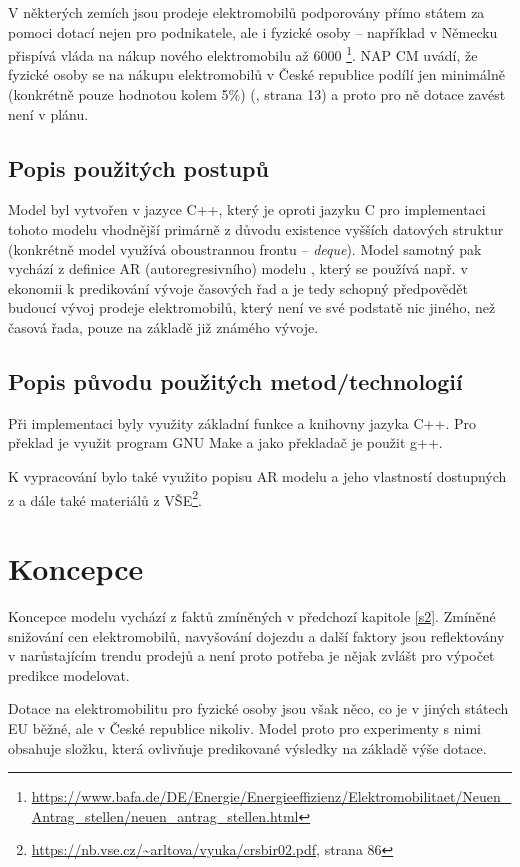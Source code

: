 \documentclass[14pt]{extarticle}
\begin{document}
	V některých zemích jsou prodeje elektromobilů podporovány přímo státem za pomoci dotací nejen pro podnikatele, ale i fyzické osoby -- například v Německu přispívá vláda na nákup nového elektromobilu až 6000	\texteuro\footnote{\url{https://www.bafa.de/DE/Energie/Energieeffizienz/Elektromobilitaet/Neuen_Antrag_stellen/neuen_antrag_stellen.html}}. NAP CM uvádí, že fyzické osoby se na nákupu elektromobilů v České republice podílí jen minimálně (konkrétně pouze hodnotou kolem 5\%) (\cite{NAP}, strana 13) a proto pro ně dotace zavést není v plánu.
	
	\subsection{Popis použitých postupů}
	Model byl vytvořen v jazyce C++, který je oproti jazyku C pro implementaci tohoto modelu vhodnější primárně z důvodu existence vyšších datových struktur (konkrétně model využívá oboustrannou frontu -- \textit{deque}). Model samotný pak vychází z definice AR (autoregresivního) modelu \cite{AR}, který se používá např. v ekonomii k predikování vývoje časových řad a je tedy schopný předpovědět budoucí vývoj prodeje elektromobilů, který není ve své podstatě nic jiného, než časová řada, pouze na základě již známého vývoje.
	
	\subsection{Popis původu použitých metod/technologií}
	Při implementaci byly využity základní funkce a knihovny jazyka C++. Pro překlad je využit program GNU Make a jako překladač je použit g++. 
	
	K vypracování bylo také využito popisu AR modelu a jeho vlastností dostupných z \cite{AR} a dále také materiálů z VŠE\footnote{\url{https://nb.vse.cz/~arltova/vyuka/crsbir02.pdf}, strana 86}. 
	
	\section{Koncepce}
	Koncepce modelu vychází z faktů zmíněných v předchozí kapitole \ref{s2}. Zmíněné snižování cen elektromobilů, navyšování dojezdu a další faktory jsou reflektovány v narůstajícím trendu prodejů a není proto potřeba je nějak zvlášt pro výpočet predikce modelovat.
	
	Dotace na elektromobilitu pro fyzické osoby jsou však něco, co je v jiných státech EU běžné, ale v České republice nikoliv. Model proto pro experimenty s nimi obsahuje složku, která ovlivňuje predikované výsledky na základě výše dotace. 
	
\end{document}
